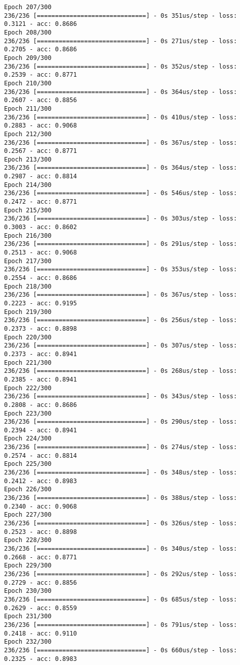 \documentclass[11pt]{article}
\begin{document}
\begin{Verbatim}[commandchars=\\\{\}]
Epoch 207/300
236/236 [==============================] - 0s 351us/step - loss: 0.3121 - acc: 0.8686
Epoch 208/300
236/236 [==============================] - 0s 271us/step - loss: 0.2705 - acc: 0.8686
Epoch 209/300
236/236 [==============================] - 0s 352us/step - loss: 0.2539 - acc: 0.8771
Epoch 210/300
236/236 [==============================] - 0s 364us/step - loss: 0.2607 - acc: 0.8856
Epoch 211/300
236/236 [==============================] - 0s 410us/step - loss: 0.2883 - acc: 0.9068
Epoch 212/300
236/236 [==============================] - 0s 367us/step - loss: 0.2567 - acc: 0.8771
Epoch 213/300
236/236 [==============================] - 0s 364us/step - loss: 0.2987 - acc: 0.8814
Epoch 214/300
236/236 [==============================] - 0s 546us/step - loss: 0.2472 - acc: 0.8771
Epoch 215/300
236/236 [==============================] - 0s 303us/step - loss: 0.3003 - acc: 0.8602
Epoch 216/300
236/236 [==============================] - 0s 291us/step - loss: 0.2513 - acc: 0.9068
Epoch 217/300
236/236 [==============================] - 0s 353us/step - loss: 0.2554 - acc: 0.8686
Epoch 218/300
236/236 [==============================] - 0s 367us/step - loss: 0.2223 - acc: 0.9195
Epoch 219/300
236/236 [==============================] - 0s 256us/step - loss: 0.2373 - acc: 0.8898
Epoch 220/300
236/236 [==============================] - 0s 307us/step - loss: 0.2373 - acc: 0.8941
Epoch 221/300
236/236 [==============================] - 0s 268us/step - loss: 0.2385 - acc: 0.8941
Epoch 222/300
236/236 [==============================] - 0s 343us/step - loss: 0.2808 - acc: 0.8686
Epoch 223/300
236/236 [==============================] - 0s 290us/step - loss: 0.2394 - acc: 0.8941
Epoch 224/300
236/236 [==============================] - 0s 274us/step - loss: 0.2574 - acc: 0.8814
Epoch 225/300
236/236 [==============================] - 0s 348us/step - loss: 0.2412 - acc: 0.8983
Epoch 226/300
236/236 [==============================] - 0s 388us/step - loss: 0.2340 - acc: 0.9068
Epoch 227/300
236/236 [==============================] - 0s 326us/step - loss: 0.2523 - acc: 0.8898
Epoch 228/300
236/236 [==============================] - 0s 340us/step - loss: 0.2668 - acc: 0.8771
Epoch 229/300
236/236 [==============================] - 0s 292us/step - loss: 0.2729 - acc: 0.8856
Epoch 230/300
236/236 [==============================] - 0s 685us/step - loss: 0.2629 - acc: 0.8559
Epoch 231/300
236/236 [==============================] - 0s 791us/step - loss: 0.2418 - acc: 0.9110
Epoch 232/300
236/236 [==============================] - 0s 660us/step - loss: 0.2325 - acc: 0.8983

\end{Verbatim}
\end{document}
